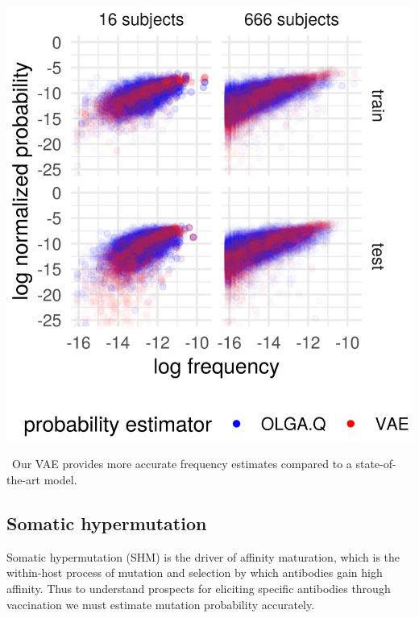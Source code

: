 \documentclass[nobib]{tufte-handout}
\begin{document}
\begin{marginfigure}[-0.8in]%
\begin{centering}
    \includegraphics[width=\textwidth]{log_normed_Ppost_vs_log_normed_Pvae.png}
\end{centering}
  \caption{\
    Our VAE provides more accurate frequency estimates compared to a state-of-the-art model.
    }
  \label{FIGfrequency}
\end{marginfigure}%

\subsection*{Somatic hypermutation}

Somatic hypermutation (SHM) is the driver of affinity maturation, which is the within-host process of mutation and selection by which antibodies gain high affinity.
Thus to understand prospects for eliciting specific antibodies through vaccination we must estimate mutation probability accurately.
\end{document}
